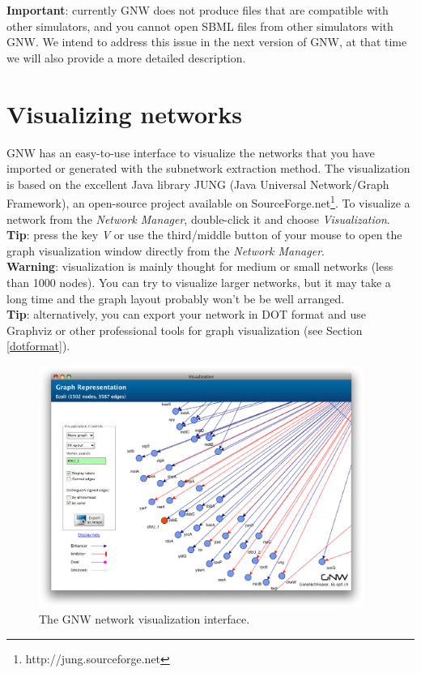\documentclass{llncs}
\begin{document}
\textbf{Important}: currently GNW does not produce files that are compatible with other simulators, and you cannot open SBML files from other simulators with GNW. We intend to address this issue in the next version of GNW, at that time we will also provide a more detailed description.



\section{Visualizing networks}

GNW has an easy-to-use interface to visualize the networks that you have imported or generated with the subnetwork extraction method. The visualization is based on the excellent Java library JUNG (Java Universal Network/Graph Framework), an open-source project available on SourceForge.net\footnote{http://jung.sourceforge.net}. To visualize a network from the \emph{Network Manager}, double-click it and choose \emph{Visualization}.\\

\textbf{Tip}: press the key \emph{V} or use the third/middle button of your mouse to open the graph visualization window directly from the \emph{Network Manager}.\\

\textbf{Warning}: visualization is mainly thought for medium or small networks (less than 1000 nodes). You can try to visualize larger networks, but it may take a long time and the graph layout probably won't be be well arranged.\\

\textbf{Tip}: alternatively, you can export your network in DOT format and use Graphviz or other professional tools for graph visualization (see Section \ref{dotformat}).\\

\begin{figure}[tbh]
\centering\includegraphics[width=10.6cm]{figures/visualization}
\caption{The GNW network visualization interface.}
\label{visualization}
\end{figure}
\end{document}
